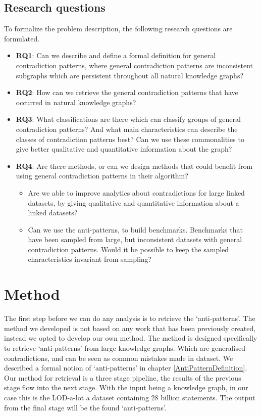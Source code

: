 \documentclass[11pt,letterpaper ,oneside ]{book}
\begin{document}
\subsection{Research questions}
To formalize the problem description, the following research questions are formulated.
\begin{itemize}
	\item \textbf{RQ1}: Can we describe and define a formal definition for general contradiction patterns, where general contradiction patterns are inconsistent subgraphs which are persistent throughout all natural knowledge graphs?
	\item \textbf{RQ2}: How can we retrieve the general contradiction patterns that have occurred in natural knowledge graphs? 
	\item \textbf{RQ3}: What classifications are there which can classify groups of general contradiction patterns? And what main characteristics can describe the classes of contradiction patterns best? Can we use these commonalities to give better qualitative and quantitative information about the graph?
	\item \textbf{RQ4}: Are there methods, or can we design methods that could benefit from using general contradiction patterns in their algorithm? 
	\begin{itemize}
		\item Are we able to improve analytics about contradictions for large linked datasets, by giving qualitative and quantitative information about a linked datasets?
		\item Can we use the anti-patterns, to build benchmarks. Benchmarks that have been sampled from large, but inconsistent datasets with general contradiction patterns. Would it be possible to keep the sampled characteristics invariant from sampling?
	\end{itemize}
\end{itemize}

\section{Method}
The first step before we can do any analysis is to retrieve the `anti-patterns'. The method we developed is not based on any work that has been previously created, instead we opted to develop our own method. The method is designed specifically to retrieve `anti-patterns' from large knowledge graphs. Which are generalised contradictions, and can be seen as common mistakes made in dataset. We described a formal notion of `anti-patterns' in chapter \ref{AntiPatternDefinition}. Our method for retrieval is a three stage pipeline, the results of the previous stage flow into the next stage. With the input being a knowledge graph, in our case this is the LOD-a-lot\cite{JavierD:2017} a dataset containing 28 billion statements. The output from the final stage will be the found `anti-patterns'. 
\end{document}
